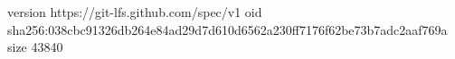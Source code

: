 version https://git-lfs.github.com/spec/v1
oid sha256:038cbc91326db264e84ad29d7d610d6562a230ff7176f62be73b7adc2aaf769a
size 43840
